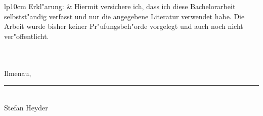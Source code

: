 \documentclass[a4paper,11pt]{article}
\begin{document}
\newpage
\thispagestyle{empty}
\vspace*{15cm}
\begin{tabular}{lp{10cm}}
{Erkl"arung:} & {Hiermit versichere ich, dass ich diese Bachelorarbeit selbstst"andig verfasst und nur die angegebene Literatur verwendet habe. Die Arbeit wurde bisher keiner Pr"ufungsbeh"orde vorgelegt und auch noch nicht ver"offentlicht.} \\
\\\\
{Ilmenau, \datum \hspace{3.2cm} \rule{4cm}{0.4pt}}\\
{\hspace{8.9cm} Stefan Heyder} \\
\end{tabular}
\end{document}
